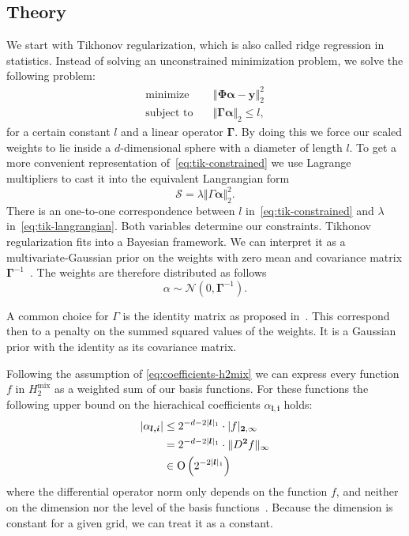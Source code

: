 \subsection{Theory}
We start with Tikhonov regularization, which is also called ridge regression in statistics.
Instead of solving an unconstrained minimization problem, we solve the following
problem:
\begin{align}\label{eq:tik-constrained}
 \text{minimize} \quad &
 \left\Vert  \bm{\Phi} \bm{\alpha} - \bm{y}  \right\Vert_2^2 \nonumber \\
\text{subject to} \quad &  \Vert \bm{\Gamma} \bm{\alpha}  \Vert_2 \leq l,
\end{align}
for a certain constant \(l\) and a linear operator \(\bm{\Gamma}\). 
By doing this we force our scaled weights to lie inside a \(d\)-dimensional sphere with a diameter of length \(l\).
To get a more convenient representation of~\cref{eq:tik-constrained} we use Lagrange multipliers to cast it into the equivalent Langrangian form
\begin{equation}\label{eq:tik-langrangian}
\mathcal{S} = \lambda \Vert \Gamma \bm{\alpha} \Vert_2^2.
\end{equation}
There is an one-to-one correspondence between \(l\) in~\cref{eq:tik-constrained} and \(\lambda\) in~\cref{eq:tik-langrangian}.
Both variables determine our constraints.
Tikhonov regularization fits into a Bayesian framework.
We can interpret it as a multivariate-Gaussian prior on the weights with zero mean and covariance matrix \(\bm{\Gamma}^{-1}\)~\cite{stat-inverse}.
The weights are therefore distributed as follows
\begin{equation*}
\alpha \sim \mathcal{N} (0, \bm{\Gamma}^{-1}).
\end{equation*}

A common choice for \(\Gamma\) is the identity matrix as proposed in~\cite{spatAdaptGrid}.
This correspond then to a penalty on the summed squared values of the weights.
It is a Gaussian prior with the identity as its covariance matrix.

Following the assumption of \vref{eq:coefficients-h2mix} we can express every function \(f\) in \(H_2^{\text{mix}}\) as a weighted sum of our basis functions.
For these functions the following upper bound on the hierachical coefficients \(\alpha_{\bm{l, i}}\) holds:
\begin{align}\label{eq:weights-bound}
  \vert \alpha_{\bm{l, i}} \vert &\leq 2^{-d -2 \vert \bm{l} \vert_1} \cdot \vert f \vert_{\bm{2}, \infty}\\
                             & = 2^{-d -2 \vert \bm{l} \vert_1} \cdot \Vert D^{\bm{2}} f \Vert_{\infty} \\
                              &\in \operatorname{O} \left( 2^{-2 \vert \bm{l} \vert_1} \right)
\end{align}
where the differential operator norm only depends on the function \(f\), and neither on the dimension nor the level of the basis functions~\cite{bungartzSparse}.
Because the dimension is constant for a given grid, we can treat it as a constant.

